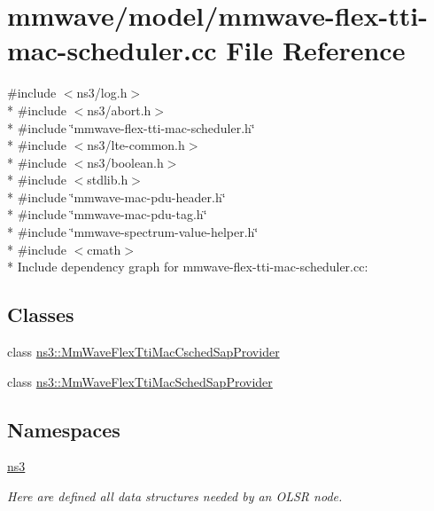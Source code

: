 \hypertarget{mmwave-flex-tti-mac-scheduler_8cc}{}\section{mmwave/model/mmwave-\/flex-\/tti-\/mac-\/scheduler.cc File Reference}
\label{mmwave-flex-tti-mac-scheduler_8cc}
{\ttfamily \#include $<$ns3/log.\+h$>$}\\*
{\ttfamily \#include $<$ns3/abort.\+h$>$}\\*
{\ttfamily \#include \char`\"{}mmwave-\/flex-\/tti-\/mac-\/scheduler.\+h\char`\"{}}\\*
{\ttfamily \#include $<$ns3/lte-\/common.\+h$>$}\\*
{\ttfamily \#include $<$ns3/boolean.\+h$>$}\\*
{\ttfamily \#include $<$stdlib.\+h$>$}\\*
{\ttfamily \#include \char`\"{}mmwave-\/mac-\/pdu-\/header.\+h\char`\"{}}\\*
{\ttfamily \#include \char`\"{}mmwave-\/mac-\/pdu-\/tag.\+h\char`\"{}}\\*
{\ttfamily \#include \char`\"{}mmwave-\/spectrum-\/value-\/helper.\+h\char`\"{}}\\*
{\ttfamily \#include $<$cmath$>$}\\*
Include dependency graph for mmwave-\/flex-\/tti-\/mac-\/scheduler.cc\+:
\subsection*{Classes}
\begin{DoxyCompactItemize}
\item 
class \hyperlink{classns3_1_1MmWaveFlexTtiMacCschedSapProvider}{ns3\+::\+Mm\+Wave\+Flex\+Tti\+Mac\+Csched\+Sap\+Provider}
\item 
class \hyperlink{classns3_1_1MmWaveFlexTtiMacSchedSapProvider}{ns3\+::\+Mm\+Wave\+Flex\+Tti\+Mac\+Sched\+Sap\+Provider}
\end{DoxyCompactItemize}
\subsection*{Namespaces}
\begin{DoxyCompactItemize}
\item 
 \hyperlink{namespacens3}{ns3}
\begin{DoxyCompactList}\small\item\em Here are defined all data structures needed by an O\+L\+SR node. \end{DoxyCompactList}\end{DoxyCompactItemize}
